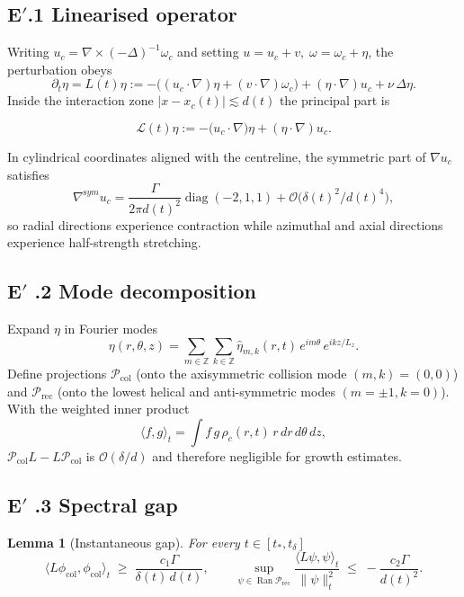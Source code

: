 \documentclass[11pt]{article}
\newtheorem{lemma}[theorem]{Lemma}
\theoremstyle{definition}
\theoremstyle{remark}
\newcommand{\nuvisc}{\nu}
\newcommand{\boxedEq}[1]{\begin{equation}\boxed{#1}\end{equation}}
\begin{document}
\subsection{\texorpdfstring{E$'$.1 Linearised operator}{E'.1 Linearised operator}}

Writing $u_c=\nabla\times(-\Delta)^{-1}\omega_c$ and setting $u=u_c+v,\;\omega=\omega_c+\eta$, the perturbation obeys
\[
\partial_t\eta=L(t)\eta:=-\bigl((u_c\!\cdot\!\nabla)\eta+(v\!\cdot\!\nabla)\omega_c\bigr)+(\eta\!\cdot\!\nabla)u_c+\nuvisc\,\Delta\eta.
\]
Inside the interaction zone $|x-x_c(t)|\lesssim d(t)$ the principal part is

\boxedEq{\mathcal L(t)\eta:=-\bigl(u_c\!\cdot\!\nabla\bigr)\eta+(\eta\!\cdot\!\nabla)u_c.}

In cylindrical coordinates aligned with the centreline, the symmetric part of $\nabla u_c$ satisfies
\[
\nabla^{\mathrm sym}\!u_c=
\frac{\Gamma}{2\pi d(t)^{2}}\operatorname{diag}(-2,1,1)+\mathcal O\!\bigl(\delta(t)^{2}/d(t)^{4}\bigr),
\]
so radial directions experience contraction while azimuthal and axial directions experience half-strength stretching.

\subsection{E\texorpdfstring{$'$}{'} .2 Mode decomposition}

Expand $\eta$ in Fourier modes
\[
\eta(r,\theta,z)=\sum_{m\in\mathbb Z}\sum_{k\in\mathbb Z}\hat\eta_{m,k}(r,t)\,e^{im\theta}\,e^{ikz/L_z}.
\]
Define projections $\mathcal P_{\mathrm{col}}$ (onto the axisymmetric collision mode $(m,k)=(0,0)$) and  
$\mathcal P_{\mathrm{rec}}$ (onto the lowest helical and anti-symmetric modes $(m=\pm1,k=0)$).  
With the weighted inner product 
\[
\langle f,g\rangle_t=\int f\,g\,\rho_c(r,t)\,r\,dr\,d\theta\,dz,
\]
$\mathcal P_{\mathrm{col}}L-L\mathcal P_{\mathrm{col}}$ is $\mathcal O(\delta/d)$ and therefore negligible for growth estimates.

\subsection{E\texorpdfstring{$'$}{'} .3 Spectral gap}

\begin{lemma}[Instantaneous gap]\label{lem:inst-gap}
For every $t\in[t_*,t_\delta]$
\boxedEq{\langle L\phi_{\mathrm{col}},\phi_{\mathrm{col}}\rangle_t\;\ge\;\dfrac{c_1\Gamma}{\delta(t)\,d(t)},\qquad 
\sup_{\psi\in\operatorname{Ran}\mathcal P_{\mathrm{rec}}}\dfrac{\langle L\psi,\psi\rangle_t}{\|\psi\|_t^{2}}\;\le\;-\dfrac{c_2\Gamma}{d(t)^{2}}.}
\end{lemma}
\end{document}

